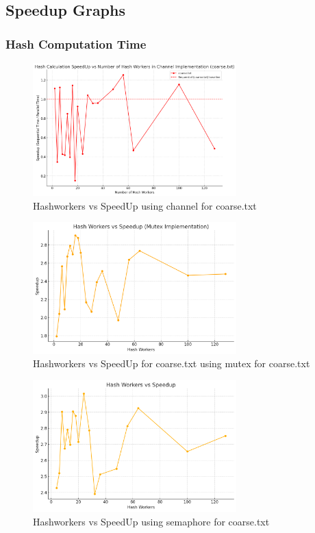 \documentclass[letterpaper,12pt]{article}
\theoremstyle{remark}
\begin{document}
\clearpage



 
\subsection{Speedup Graphs}
\subsubsection{Hash Computation Time}
\begin{figure}[ht]
    \centering
    \includegraphics[width=0.7\textwidth]{hashworkerCoarse.png}
    \caption{Hashworkers vs SpeedUp using channel  for coarse.txt}
    \label{fig:Hashworkers vs SpeedUp}
\end{figure}

\begin{figure}[ht]
    \centering
    \includegraphics[width=0.7\textwidth]{mutexImplHash.png}
    \caption{Hashworkers vs SpeedUp for coarse.txt using mutex for coarse.txt}
    \label{fig:Hashworkers vs SpeedUp}
\end{figure}


\begin{figure}[ht]
    \centering
    \includegraphics[width=0.7\textwidth]{semaphoreImplHash.png}
    \caption{Hashworkers vs SpeedUp  using semaphore for coarse.txt}
    \label{fig:Hashworkers vs SpeedUp}
\end{figure}
\end{document}
